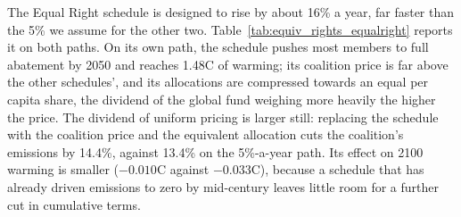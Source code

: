 \documentclass[12pt,english]{article}
\theoremstyle{remark}
\begin{document}



The Equal Right schedule is designed to rise by about 16\% a year, far faster than the 5\% we assume for the other two. Table~\ref{tab:equiv_rights_equalright} reports it on both paths. On its own path, the schedule pushes most members to full abatement by 2050 and reaches 1.48\textdegree C of warming; its coalition price is far above the other schedules', and its allocations are compressed towards an equal per capita share, the dividend of the global fund weighing more heavily the higher the price. The dividend of uniform pricing is larger still: replacing the schedule with the coalition price and the equivalent allocation cuts the coalition's emissions by 14.4\%, against 13.4\% on the 5\%-a-year path. Its effect on 2100 warming is smaller ($-0.010$\textdegree C against $-0.033$\textdegree C), because a schedule that has already driven emissions to zero by mid-century leaves little room for a further cut in cumulative terms.
\end{document}
